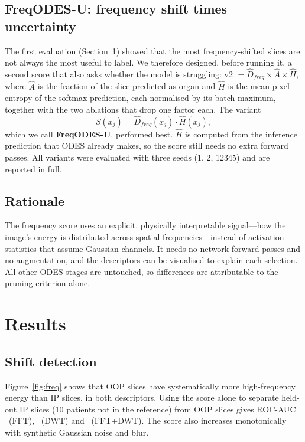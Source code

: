 \documentclass[a4paper,fleqn]{cas-sc}
\begin{document}
\subsection{FreqODES-U: frequency shift times uncertainty}
The first evaluation (Section~\ref{sec:results}) showed that the most frequency-shifted slices are not always the most useful to label. We therefore designed, before running it, a second score that also asks whether the model is struggling: v2 $=\hat D_{freq}\times\hat A\times\hat H$, where $\hat A$ is the fraction of the slice predicted as organ and $\hat H$ is the mean pixel entropy of the softmax prediction, each normalised by its batch maximum, together with the two ablations that drop one factor each. The variant
\begin{equation}
S(x_j)=\hat D_{freq}(x_j)\cdot\hat H(x_j),
\end{equation}
which we call \textbf{FreqODES-U}, performed best. $\hat H$ is computed from the inference prediction that ODES already makes, so the score still needs no extra forward passes. All variants were evaluated with three seeds (1, 2, 12345) and are reported in full.

\subsection{Rationale}
The frequency score uses an explicit, physically interpretable signal---how the image's energy is distributed across spatial frequencies---instead of activation statistics that assume Gaussian channels. It needs no network forward passes and no augmentation, and the descriptors can be visualised to explain each selection. All other ODES stages are untouched, so differences are attributable to the pruning criterion alone.

\section{Results}\label{sec:results}
\subsection{Shift detection}
Figure~\ref{fig:freq} shows that OOP slices have systematically more high-frequency energy than IP slices, in both descriptors. Using the score alone to separate held-out IP slices (10 patients not in the reference) from OOP slices gives ROC-AUC \AUCFFT\ (FFT), \AUCDWT\ (DWT) and \AUCFREQ\ (FFT+DWT). The score also increases monotonically with synthetic Gaussian noise and blur.
\end{document}

